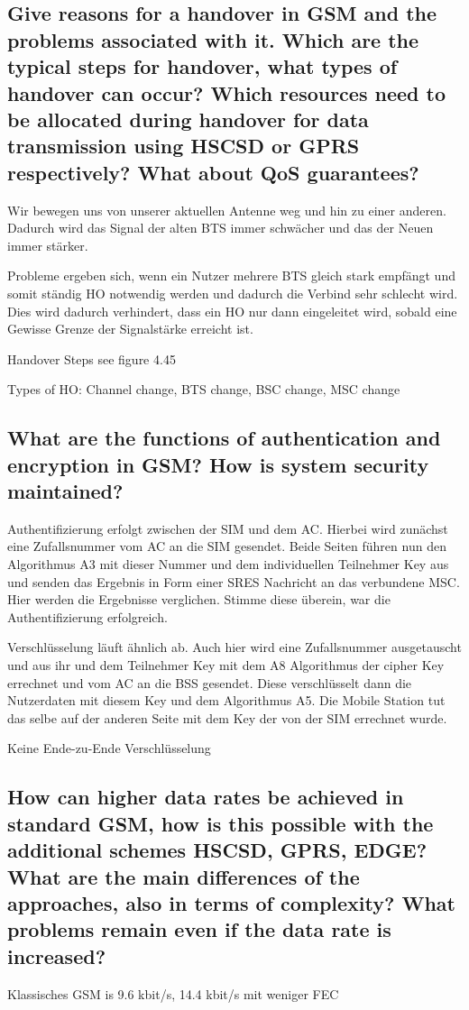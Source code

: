 \subsection{Give reasons for a handover in GSM and the problems associated with it. Which are the typical steps for handover, what types of handover can occur? Which resources need to be allocated during handover for data transmission using HSCSD or GPRS respectively? What about QoS guarantees?}
Wir bewegen uns von unserer aktuellen Antenne weg und hin zu einer anderen. Dadurch wird das Signal der alten BTS immer schwächer und das der Neuen immer stärker.


Probleme ergeben sich, wenn ein Nutzer mehrere BTS gleich stark empfängt und somit ständig HO notwendig werden und dadurch die Verbind sehr schlecht wird. Dies wird dadurch verhindert, dass ein HO nur dann eingeleitet wird, sobald eine Gewisse Grenze der Signalstärke erreicht ist.


Handover Steps see figure 4.45


Types of HO: Channel change, BTS change, BSC change, MSC change

\subsection{What are the functions of authentication and encryption in GSM? How is system security maintained?}
Authentifizierung erfolgt zwischen der SIM und dem AC. Hierbei wird zunächst eine Zufallsnummer vom AC an die SIM gesendet. Beide Seiten führen nun den Algorithmus A3 mit dieser Nummer und dem individuellen Teilnehmer Key aus und senden das Ergebnis in Form einer SRES Nachricht an das verbundene MSC. Hier werden die Ergebnisse verglichen. Stimme diese überein, war die Authentifizierung erfolgreich.

Verschlüsselung läuft ähnlich ab. Auch hier wird eine Zufallsnummer ausgetauscht und aus ihr und dem Teilnehmer Key mit dem A8 Algorithmus der cipher Key errechnet und vom AC an die BSS gesendet. Diese verschlüsselt dann die Nutzerdaten mit diesem Key und dem Algorithmus A5. Die Mobile Station tut das selbe auf der anderen Seite mit dem Key der von der SIM errechnet wurde.

Keine Ende-zu-Ende Verschlüsselung 

\subsection{How can higher data rates be achieved in standard GSM, how is this possible with the additional schemes HSCSD, GPRS, EDGE? What are the main differences of the approaches, also in terms of complexity? What problems remain even if the data rate is increased?}
Klassisches GSM is 9.6 kbit/s, 14.4 kbit/s mit weniger FEC

